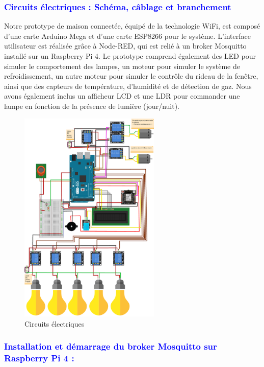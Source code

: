 \begin{flushleft}
	\subsubsection{\textcolor{blue}{Circuits électriques : Schéma, câblage et branchement} }
		Notre prototype de maison connectée, équipé de la technologie WiFi, est composé d'une carte Arduino Mega et d'une carte ESP8266 pour le système. L'interface utilisateur est réalisée grâce à Node-RED, qui est relié à un broker Mosquitto installé sur un Raspberry Pi 4. Le prototype comprend également des LED pour simuler le comportement des lampes, un moteur pour simuler le système de refroidissement, un autre moteur pour simuler le contrôle du rideau de la fenêtre, ainsi que des capteurs de température, d'humidité et de détection de gaz. Nous avons également inclus un afficheur LCD et une LDR pour commander une lampe en fonction de la présence de lumière (jour/nuit).
			\begin{figure}[h]
				\centering
				\includegraphics[width=0.6\textwidth]{chapitres/images/Simulation-Format-Fritzing_WiFi_bb.png}
				\caption{Circuits électriques}
				\label{fig:labelname}
			\end{figure}
		\newpage
	\subsubsection{\textcolor{blue}{Installation et démarrage du broker Mosquitto sur Raspberry Pi 4 :} }
				

\end{flushleft}

